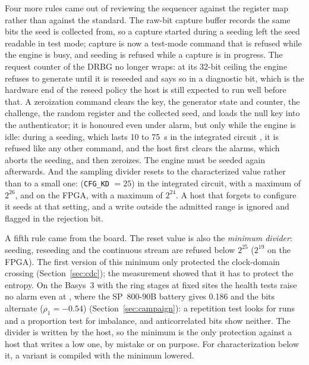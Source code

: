 Four more rules came out of reviewing the sequencer against the register
map rather than against the standard. The raw-bit capture buffer records
the same bits the seed is collected from, so a capture started during a
seeding left the seed readable in test mode; capture is now a test-mode
command that is refused while the engine is busy, and seeding is refused
while a capture is in progress. The request counter of the \ac{DRBG} no
longer wraps: at its 32-bit ceiling the engine refuses to generate until
it is reseeded and says so in a diagnostic bit, which is the hardware
end of the reseed policy the host is still expected to run well before
that. A zeroization command clears the key, the generator state and
counter, the challenge, the random register and the collected seed, and
loads the null key into the authenticator; it is honoured even under
alarm, but only while the engine is idle: during a seeding, which lasts
10 to 75~s in the integrated circuit \est{}, it is refused like any
other command, and the host first clears the alarms, which aborts the
seeding, and then zeroizes. The engine must be seeded again afterwards.
And the sampling
divider resets to the characterized value rather than to a small one:
 (\texttt{CFG\_KD} $= 25$) in the integrated circuit, with a
maximum of $2^{26}$, and  on the \ac{FPGA}, with a maximum of
$2^{24}$. A host that forgets to configure it seeds at that setting,
and a write outside the admitted range is ignored and flagged in the
rejection bit.

A fifth rule came from the board. The reset value is also the
\emph{minimum divider}: seeding, reseeding and the continuous stream are
refused below $2^{25}$ ($2^{19}$ on the \ac{FPGA}). The first version of
this minimum only protected the clock-domain crossing
(Section~\ref{sec:cdc}); the measurement showed that it has to protect
the entropy. On the Basys~3 with the ring stages at fixed sites the
health tests raise no alarm even at , where the SP~800-90B battery
gives 0.186 and the bits alternate ($\rho_1 = -0.54$) \meas{}
(Section~\ref{sec:campaign}): a repetition test looks for runs and a
proportion test for imbalance, and anticorrelated bits show neither. The
divider is written by the host, so the minimum is the only protection
against a host that writes a low one, by mistake or on purpose. For
characterization below it, a variant is compiled with the minimum
lowered.

